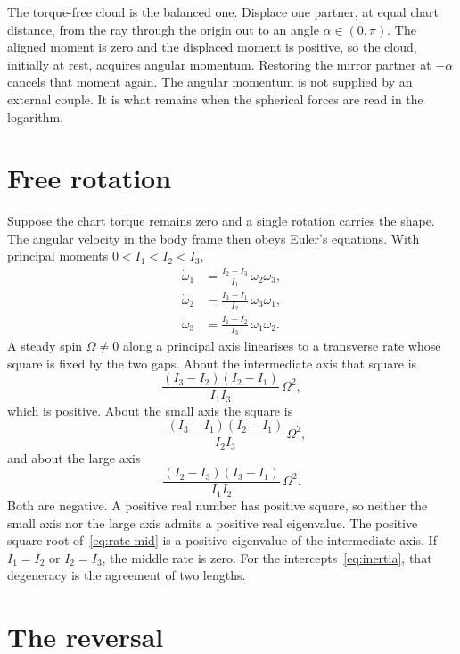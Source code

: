 \documentclass[a4paper]{article}
\begin{document}
The torque-free cloud is the balanced one. Displace one partner, at equal chart distance, from the ray through the origin out to an angle \(\alpha\in(0,\pi)\). The aligned moment is zero and the displaced moment is positive, so the cloud, initially at rest, acquires angular momentum. Restoring the mirror partner at \(-\alpha\) cancels that moment again. The angular momentum is not supplied by an external couple. It is what remains when the spherical forces are read in the logarithm.

\section{Free rotation}
\label{sec:euler}

Suppose the chart torque remains zero and a single rotation carries the shape. The angular velocity in the body frame then obeys Euler's equations. With principal moments \(0<I_1<I_2<I_3\),
\begin{equation}
\label{eq:euler}
\begin{aligned}
\dot\omega_1&=\frac{I_2-I_3}{I_1}\,\omega_2\omega_3,\\
\dot\omega_2&=\frac{I_3-I_1}{I_2}\,\omega_3\omega_1,\\
\dot\omega_3&=\frac{I_1-I_2}{I_3}\,\omega_1\omega_2.
\end{aligned}
\end{equation}
A steady spin \(\Omega\neq 0\) along a principal axis linearises to a transverse rate whose square is fixed by the two gaps. About the intermediate axis that square is
\begin{equation}
\label{eq:rate-mid}
\frac{(I_3-I_2)(I_2-I_1)}{I_1 I_3}\,\Omega^2,
\end{equation}
which is positive. About the small axis the square is
\[
-\frac{(I_3-I_1)(I_2-I_1)}{I_2 I_3}\,\Omega^2,
\]
and about the large axis
\[
\frac{(I_2-I_3)(I_3-I_1)}{I_1 I_2}\,\Omega^2.
\]
Both are negative. A positive real number has positive square, so neither the small axis nor the large axis admits a positive real eigenvalue. The positive square root of~\eqref{eq:rate-mid} is a positive eigenvalue of the intermediate axis. If \(I_1=I_2\) or \(I_2=I_3\), the middle rate is zero. For the intercepts~\eqref{eq:inertia}, that degeneracy is the agreement of two lengths.

\section{The reversal}
\label{sec:reversal}
\end{document}
